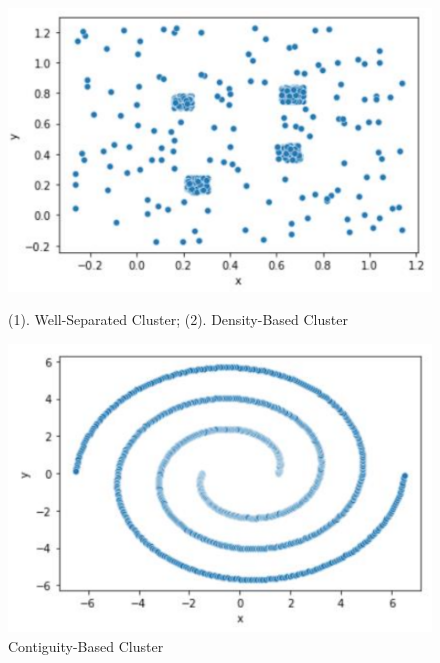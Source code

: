 \documentclass[11pt]{elegantbook}
\begin{document}
\begin{center}
\begin{figure}[htbp]
    \includegraphics[scale=0.25]{density-based.png}
    \caption{(1). Well-Separated Cluster; (2). Density-Based Cluster}
    \includegraphics[scale=0.2]{Contiguity-based.png}
    \caption{Contiguity-Based Cluster}
\end{figure}\end{center}
\end{document}

